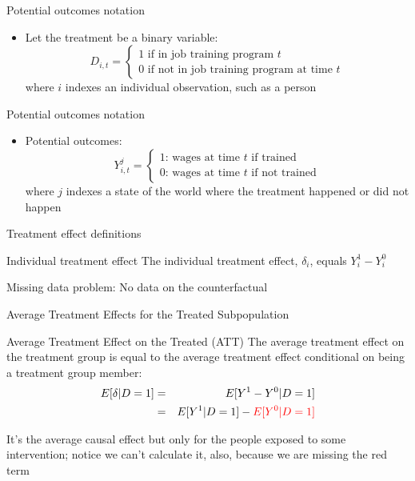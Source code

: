 \documentclass{beamer}
\begin{document}
\begin{frame}{Potential outcomes notation}
	
	\begin{itemize}
	\item Let the treatment be a binary variable: $$D_{i,t} =\begin{cases} 1 \text{ if in job training program $t$} \\ 0 \text{ if not in job training program at time $t$} \end{cases}$$where $i$ indexes an individual observation, such as a person

	\end{itemize}
\end{frame}

\begin{frame}{Potential outcomes notation}
	
	\begin{itemize}

	\item Potential outcomes: $$Y_{i,t}^j =\begin{cases} 1 \text{: wages at time $t$ if trained} \\ 0 \text{: wages at time $t$ if not trained} \end{cases}$$where $j$ indexes a state of the world where the treatment happened or did not happen

	\end{itemize}
\end{frame}



\begin{frame}{Treatment effect definitions}


	\begin{block}{Individual treatment effect}
	    The individual treatment effect,  $\delta_i$, equals $Y_i^1-Y_i^0$
	\end{block}

Missing data problem:  No data on the counterfactual 
	
\end{frame}




\begin{frame}{Average Treatment Effects for the Treated Subpopulation}	
	\begin{block}{Average Treatment Effect on the Treated (ATT)}
	The average treatment effect on the treatment group is equal to the average treatment effect conditional on being a treatment group member:
		\begin{eqnarray*}
		E[\delta|D=1]&=&E[Y^1-Y^0|D=1] \nonumber \\
		&=&E[Y^1|D=1]-\textcolor{red}{E[Y^0|D=1]}
		\end{eqnarray*}
	\end{block}
	
	\bigskip

It's the average causal effect but only for the people exposed to some intervention; notice we can't calculate it, also, because we are missing the red term

	
\end{frame}
\end{document}

